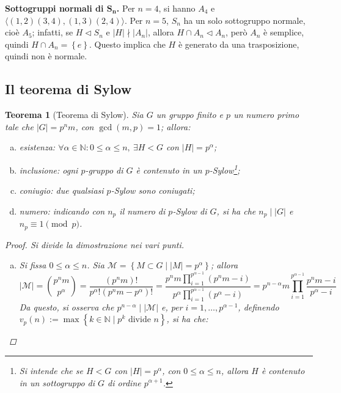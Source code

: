 \documentclass[11pt]{scrartcl}
\theoremstyle{style1}
\newtheorem{teorema}{Teorema}[section]
\numberwithin{equation}{subsection}
\renewcommand{\textbf}[1]{\textsf{\bfseries #1}}
\begin{document}
\textbf{Sottogruppi normali di $\mathbf{S_n} $.} Per $n=4$, si hanno $A_4$ e $\langle (1,2)(3,4),(1,3)(2,4) \rangle$.
Per $n=5$, $S_n$ ha un solo sottogruppo normale, cio\`e $A_5$; infatti, se $H\lhd S_n$ e $|H|\nmid |A_n|$, allora $H\cap A_n \lhd A_n$, per\`o $A_n$ \`e semplice, quindi $H\cap A_n = \left\{ e \right\} $.
Questo implica che $H$ \`e generato da una trasposizione, quindi non \`e normale.


\subsection{Il teorema di Sylow}
\begin{teorema}
	[Teorema di Sylow]
	Sia $G$ un gruppo finito e $p$ un numero primo tale che $\lvert G \rvert =p^n m$, con $\operatorname{gcd}(m,p) =1$; allora:
	\begin{enumerate}[(a).]
		\item \textit{esistenza}: $\forall \alpha \in \mathbb{N} : 0\le \alpha \le n, \ \exists H < G$ con $\lvert H \rvert = p^\alpha $;
		\item \textit{inclusione}: ogni $p$-gruppo di $G$ \`e contenuto in un $p$-Sylow\footnote{Si intende che se $H < G$ con $\lvert H \rvert = p^\alpha $, con $0\le \alpha\le n $, allora $H$ \`e contenuto in un sottogruppo di $G$ di ordine $p^{\alpha  + 1} $.};
		\item \textit{coniugio}: due qualsiasi $p$-Sylow sono coniugati;
		\item \textit{numero}: indicando con $n_p$ il numero di $p$-Sylow di $G$, si ha che $n_p  \mid |G|$ e $n_p \equiv 1 \pmod{p} $.
	\end{enumerate}
	\begin{proof}
		Si divide la dimostrazione nei vari punti.
		\begin{enumerate}[(a).]
			\item Si fissa $0\le \alpha \le n$. 
				Sia $\mathcal{M} = \left\{ M \subset G  \mid \lvert M \rvert = p^\alpha  \right\} $; allora 
				\[
						\lvert \mathcal{M}  \rvert =\binom{p^n m}{p^\alpha } = \frac{(p^nm)!}{p^\alpha ! (p^nm-p^\alpha )!} = \frac{\displaystyle p^n m \prod_{i=1} ^{p^{\alpha -1} } (p^n m - i)}{p^\alpha \displaystyle \prod_{i=1} ^{p^{\alpha -1} } (p^{\alpha }-i) } = p^{n-\alpha } m \prod_{i=1} ^{p^{\alpha -1} } \frac{p^n m - i}{p^\alpha  -i}
				\] 
				Da questo, si osserva che $p^{n-\alpha }  \mid  |\mathcal{M} |$ e, per $i=1,\ldots,p^{\alpha -1} $, definendo $v_p(n):=\max \left\{ k \in \mathbb{N}  \mid p^k \text{ divide } n \right\} $, si ha che:

\end{enumerate}
\end{proof}
\end{teorema}
\end{document}
